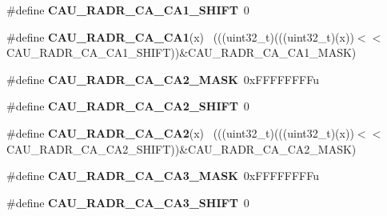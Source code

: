 \begin{DoxyCompactItemize}
\item 
\hypertarget{group___c_a_u___register___masks_ga1a0bd671ac27226fa5dd3c491a5f74c4}{}\#define {\bfseries C\+A\+U\+\_\+\+R\+A\+D\+R\+\_\+\+C\+A\+\_\+\+C\+A1\+\_\+\+S\+H\+I\+F\+T}~0\label{group___c_a_u___register___masks_ga1a0bd671ac27226fa5dd3c491a5f74c4}

\item 
\hypertarget{group___c_a_u___register___masks_ga89bb25e29c5c57e466f9e71824113a6e}{}\#define {\bfseries C\+A\+U\+\_\+\+R\+A\+D\+R\+\_\+\+C\+A\+\_\+\+C\+A1}(x)                                          ~(((uint32\+\_\+t)(((uint32\+\_\+t)(x))$<$$<$C\+A\+U\+\_\+\+R\+A\+D\+R\+\_\+\+C\+A\+\_\+\+C\+A1\+\_\+\+S\+H\+I\+F\+T))\&C\+A\+U\+\_\+\+R\+A\+D\+R\+\_\+\+C\+A\+\_\+\+C\+A1\+\_\+\+M\+A\+S\+K)\label{group___c_a_u___register___masks_ga89bb25e29c5c57e466f9e71824113a6e}

\item 
\hypertarget{group___c_a_u___register___masks_ga7fa186d5e73cc29fa76adb228433030e}{}\#define {\bfseries C\+A\+U\+\_\+\+R\+A\+D\+R\+\_\+\+C\+A\+\_\+\+C\+A2\+\_\+\+M\+A\+S\+K}~0x\+F\+F\+F\+F\+F\+F\+F\+Fu\label{group___c_a_u___register___masks_ga7fa186d5e73cc29fa76adb228433030e}

\item 
\hypertarget{group___c_a_u___register___masks_gac9854347914cb338851c9a252aca148e}{}\#define {\bfseries C\+A\+U\+\_\+\+R\+A\+D\+R\+\_\+\+C\+A\+\_\+\+C\+A2\+\_\+\+S\+H\+I\+F\+T}~0\label{group___c_a_u___register___masks_gac9854347914cb338851c9a252aca148e}

\item 
\hypertarget{group___c_a_u___register___masks_ga4aa04f2bda196f68bc0216ee9102c15d}{}\#define {\bfseries C\+A\+U\+\_\+\+R\+A\+D\+R\+\_\+\+C\+A\+\_\+\+C\+A2}(x)                                          ~(((uint32\+\_\+t)(((uint32\+\_\+t)(x))$<$$<$C\+A\+U\+\_\+\+R\+A\+D\+R\+\_\+\+C\+A\+\_\+\+C\+A2\+\_\+\+S\+H\+I\+F\+T))\&C\+A\+U\+\_\+\+R\+A\+D\+R\+\_\+\+C\+A\+\_\+\+C\+A2\+\_\+\+M\+A\+S\+K)\label{group___c_a_u___register___masks_ga4aa04f2bda196f68bc0216ee9102c15d}

\item 
\hypertarget{group___c_a_u___register___masks_ga954f8fa4bd147e796210d7d13b423765}{}\#define {\bfseries C\+A\+U\+\_\+\+R\+A\+D\+R\+\_\+\+C\+A\+\_\+\+C\+A3\+\_\+\+M\+A\+S\+K}~0x\+F\+F\+F\+F\+F\+F\+F\+Fu\label{group___c_a_u___register___masks_ga954f8fa4bd147e796210d7d13b423765}

\item 
\hypertarget{group___c_a_u___register___masks_ga63b462a741709ed694a6bb20912783e4}{}\#define {\bfseries C\+A\+U\+\_\+\+R\+A\+D\+R\+\_\+\+C\+A\+\_\+\+C\+A3\+\_\+\+S\+H\+I\+F\+T}~0\label{group___c_a_u___register___masks_ga63b462a741709ed694a6bb20912783e4}


\end{DoxyCompactItemize}
